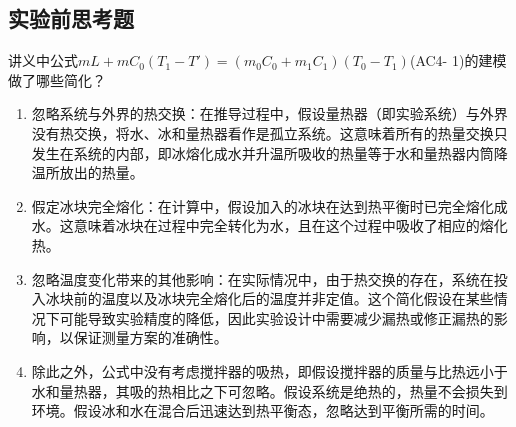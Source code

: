 \documentclass[dvipsnames, svgnames,a4paper,11pt]{article}
\begin{document}
	\subsection{实验前思考题}
	\begin{question}
		讲义中公式$mL+mC_0(T_1-T')=(m_0C_0+m_1C_1)(T_0-T_1)$(AC4- 1)的建模做了哪些简化？
	\end{question}
	\begin{enumerate}
		\item 忽略系统与外界的热交换：在推导过程中，假设量热器（即实验系统）与外界没有热交换，将水、冰和量热器看作是孤立系统。这意味着所有的热量交换只发生在系统的内部，即冰熔化成水并升温所吸收的热量等于水和量热器内筒降温所放出的热量。
		
		\item 假定冰块完全熔化：在计算中，假设加入的冰块在达到热平衡时已完全熔化成水。这意味着冰块在过程中完全转化为水，且在这个过程中吸收了相应的熔化热。
		
		\item 忽略温度变化带来的其他影响：在实际情况中，由于热交换的存在，系统在投入冰块前的温度以及冰块完全熔化后的温度并非定值。这个简化假设在某些情况下可能导致实验精度的降低，因此实验设计中需要减少漏热或修正漏热的影响，以保证测量方案的准确性。
		
		\item 除此之外，公式中没有考虑搅拌器的吸热，即假设搅拌器的质量与比热远小于水和量热器，其吸的热相比之下可忽略。假设系统是绝热的，热量不会损失到环境。假设冰和水在混合后迅速达到热平衡态，忽略达到平衡所需的时间。
	\end{enumerate}
	
\end{document}
